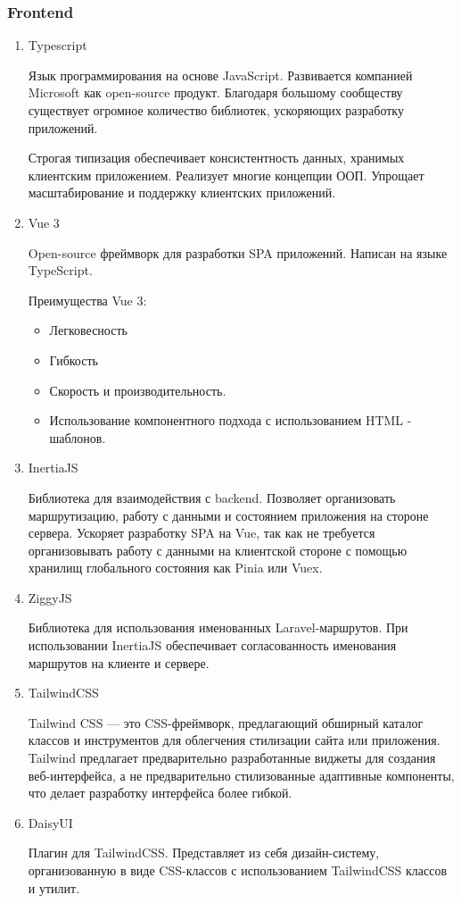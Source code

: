 \documentclass[./tools.tex]{subfiles}
\begin{document}
  \subsubsection{Frontend}
  \begin{enumerate}
    \item Typescript
    \par
    Язык программирования на основе JavaScript. Развивается компанией Microsoft как open-source продукт. Благодаря большому сообществу существует огромное количество библиотек, ускоряющих разработку приложений.
    \par
    Строгая типизация обеспечивает консистентность данных, хранимых клиентским приложением. Реализует многие концепции ООП. Упрощает масштабирование и поддержку клиентских приложений.
    \item Vue 3
    \par
    Open-source фреймворк для разработки SPA приложений. Написан на языке TypeScript.
    \par
    Преимущества Vue 3:
    \begin{itemize}
      \item Легковесность
      \item Гибкость
      \item Скорость и производительность.
      \item Использование компонентного подхода с использованием HTML - шаблонов.
    \end{itemize}
    \item InertiaJS
    \par
    Библиотека для взаимодействия с backend. Позволяет организовать маршрутизацию, работу с данными и состоянием приложения на стороне сервера. Ускоряет разработку SPA на Vue, так как не требуется организовывать работу с данными на клиентской стороне с помощью хранилищ глобального состояния как Pinia или Vuex.
    \item ZiggyJS 
    \par
    Библиотека для использования именованных Laravel-маршрутов. При использовании InertiaJS обеспечивает согласованность именования маршрутов на клиенте и сервере.
    \item TailwindCSS
    \par
    Tailwind CSS — это CSS-фреймворк, предлагающий обширный каталог классов и инструментов для облегчения стилизации сайта или приложения. Tailwind предлагает предварительно разработанные виджеты для создания веб-интерфейса, а не предварительно стилизованные адаптивные компоненты, что делает разработку интерфейса более гибкой.
    \item DaisyUI
    \par
    Плагин для TailwindCSS. Представляет из себя дизайн-систему, организованную в виде CSS-классов с использованием TailwindCSS классов и утилит.
  \end{enumerate}
\end{document}
